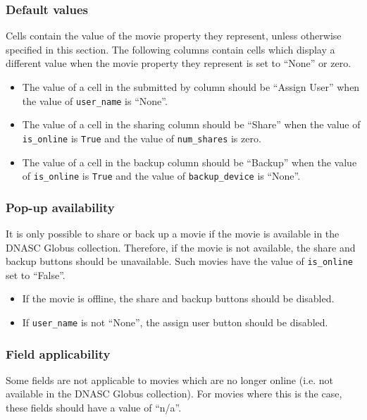 \subsubsection{Default values}

Cells contain the value of the movie property they represent, unless otherwise specified in
this section. The following columns contain cells which display a different value when the movie 
property they represent is set to ``None'' or zero.
\begin{itemize}
    \item The value of a cell in the submitted by column should be ``Assign User''
    when the value of \texttt{user\_name} is ``None''.
    \item The value of a cell in the sharing column should be ``Share'' when the
    value of \texttt{is\_online} is \texttt{True} and the value of \texttt{num\_shares} is zero.
    \item The value of a cell in the backup column should be ``Backup'' when the
    value of \texttt{is\_online} is \texttt{True} and the value of \texttt{backup\_device} is ``None''.
\end{itemize}

\subsubsection{Pop-up availability}

It is only possible to share or back up a movie if the movie is available in the DNASC Globus
collection. Therefore, if the movie is not available, the share and backup buttons should be
unavailable. Such movies have the value of \texttt{is\_online} set to ``False''.

\begin{itemize}
    \item If the movie is offline, the share and backup buttons should be disabled.
    \item If \texttt{user\_name} is not ``None'', the assign user button should be disabled.
\end{itemize}

\subsubsection{Field applicability}

Some fields are not applicable to movies which are no longer online (i.e. not available in the
DNASC Globus collection). For movies where this is the case, these fields should have a value
of ``n/a''.

